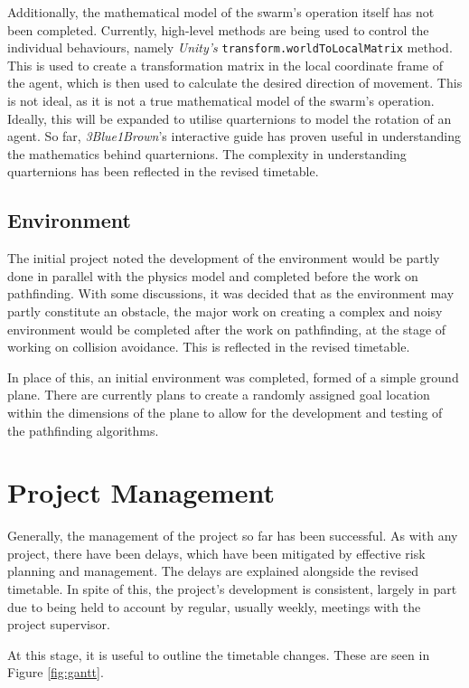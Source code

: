 \documentclass{article}
\begin{document}
Additionally, the mathematical model of the swarm's operation itself has not been completed. Currently, high-level methods are being used to control the individual behaviours, namely \emph{Unity's} \verb|transform.worldToLocalMatrix| method. This is used to create a transformation matrix in the local coordinate frame of the agent, which is then used to calculate the desired direction of movement. This is not ideal, as it is not a true mathematical model of the swarm's operation. Ideally, this will be expanded to utilise quarternions to model the rotation of an agent. So far, \emph{3Blue1Brown}'s interactive guide has proven useful in understanding the mathematics behind quarternions\cite{3Blue1Brown}. The complexity in understanding quarternions has been reflected in the revised timetable.

\subsection{Environment}
The initial project noted the development of the environment would be partly done in parallel with the physics model and completed before the work on pathfinding. With some discussions, it was decided that as the environment may partly constitute an obstacle, the major work on creating a complex and noisy environment would be completed after the work on pathfinding, at the stage of working on collision avoidance. This is reflected in the revised timetable.

In place of this, an initial environment was completed, formed of a simple ground plane. There are currently plans to create a randomly assigned goal location within the dimensions of the plane to allow for the development and testing of the pathfinding algorithms.

\section{Project Management}
\label{sec:timetable}

Generally, the management of the project so far has been successful. As with any project, there have been delays, which have been mitigated by effective risk planning and management. The delays are explained alongside the revised timetable. In spite of this, the project's development is consistent, largely in part due to being held to account by regular, usually weekly, meetings with the project supervisor.

At this stage, it is useful to outline the timetable changes. These are seen in Figure \ref{fig:gantt}.
\end{document}
